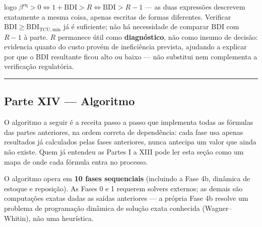 \documentclass[
  10pt,
]{article}
\begin{document}
logo
\(\beta^{\mathrm{eq}}>0 \iff 1+\mathrm{BDI}>R \iff \mathrm{BDI}>R-1\)
--- as duas expressões descrevem exatamente a mesma coisa, apenas
escritas de formas diferentes. Verificar
\(\mathrm{BDI}\ge\mathrm{BDI}_{\mathrm{TCU,min}}\) já é suficiente; não
há necessidade de comparar \(\mathrm{BDI}\) com \(R-1\) à parte. \(R\)
permanece útil como \textbf{diagnóstico}, não como insumo de decisão:
evidencia quanto do custo provém de ineficiência prevista, ajudando a
explicar por que o BDI resultante ficou alto ou baixo --- não substitui
nem complementa a verificação regulatória.

\begin{center}\rule{0.5\linewidth}{0.5pt}\end{center}

\hypertarget{parte-xiv-algoritmo}{%
\subsection{Parte XIV --- Algoritmo}\label{parte-xiv-algoritmo}}

O algoritmo a seguir é a receita passo a passo que implementa todas as
fórmulas das partes anteriores, na ordem correta de dependência: cada
fase usa apenas resultados já calculados pelas fases anteriores, nunca
antecipa um valor que ainda não existe. Quem já entendeu as Partes I a
XIII pode ler esta seção como um mapa de onde cada fórmula entra no
processo.

O algoritmo opera em \textbf{10 fases sequenciais} (incluindo a Fase 4b,
dinâmica de estoque e reposição). As Fases 0 e 1 requerem solvers
externos; as demais são computações exatas dadas as saídas anteriores
--- a própria Fase 4b resolve um problema de programação dinâmica de
solução exata conhecida (Wagner--Whitin), não uma heurística.
\end{document}
